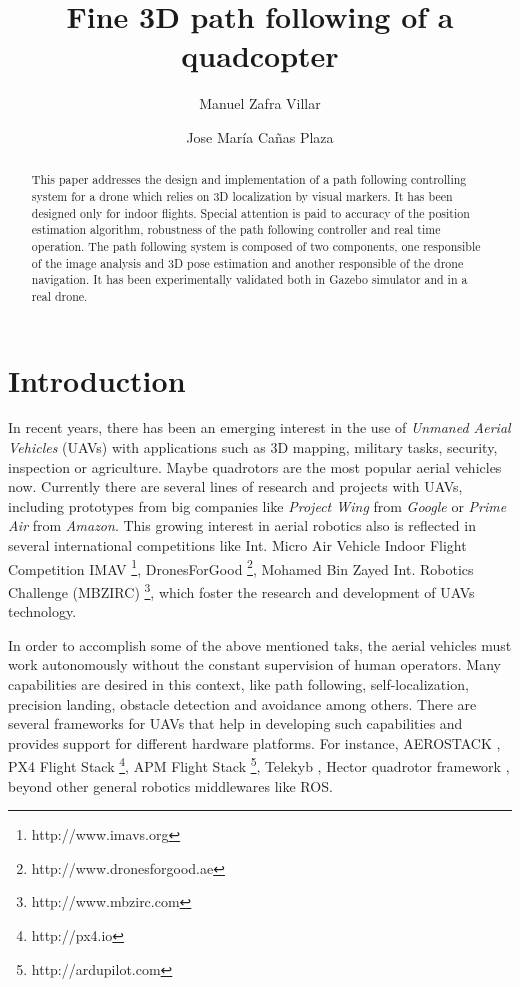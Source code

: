 \documentclass{styles/svproc}
\begin{document}
\title{Fine 3D path following of a quadcopter}
\author{Manuel Zafra Villar \and Jose María Cañas Plaza}
\maketitle

\begin{abstract}
This paper addresses the design and implementation of a path following controlling system for a drone which relies on 3D localization by visual markers. It has been designed only for indoor flights. Special attention is paid to accuracy of the position estimation algorithm, robustness of the path following controller and real time operation. The path following system is composed of two components, one responsible of the image analysis and 3D pose estimation and another responsible of the drone navigation. It has been experimentally validated both in Gazebo simulator and in a real drone. 
\end{abstract}

\section{Introduction}

	In recent years, 
there has been an emerging interest in the use of \textit{Unmaned Aerial Vehicles} (UAVs) with applications such as 3D mapping, military tasks, security, inspection \cite{nikolic2014} or agriculture. Maybe quadrotors are the most popular aerial vehicles now. Currently there are several lines of research and projects with UAVs, including prototypes from big companies like \textit{Project Wing} from \textit{Google} or \textit{Prime Air} from \textit{Amazon}. 
        This growing interest in aerial robotics also is reflected in several international competitions like Int. Micro Air Vehicle Indoor Flight Competition IMAV \footnote{http://www.imavs.org}, DronesForGood \footnote{http://www.dronesforgood.ae}, Mohamed Bin Zayed Int. Robotics Challenge (MBZIRC) \footnote{http://www.mbzirc.com}, which foster the research and development of UAVs technology.


	In order to accomplish some of the above mentioned taks, the aerial vehicles must work autonomously without the constant supervision of human operators. Many capabilities are desired in this context, like path following, self-localization, precision landing, obstacle detection and avoidance among others. There are several frameworks for UAVs that help in developing such capabilities and provides support for different hardware platforms. For instance, AEROSTACK \cite{sanchezlopez2016}, PX4 Flight Stack \footnote{http://px4.io}, APM Flight Stack \footnote{http://ardupilot.com}, Telekyb \cite{grabe2013}, Hector quadrotor framework \cite{kohlbrecher2014}, beyond other general robotics middlewares like ROS.
\end{document}
